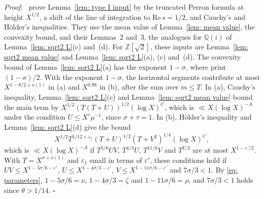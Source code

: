 \documentclass{article}
\numberwithin{equation}{section}
\newenvironment{proof}[1][Proof]{\par\medskip\noindent\textit{#1.}\ }{\hfill$\square$\par\medskip}
\newcommand{\Le}{\leqslant}
\begin{document}
\begin{proof}
\citet[pp.~126--127]{harman2001gaussian} prove Lemma~\ref{lem: type I input} by the truncated Perron formula at height $X^{1/2}$, a shift of the line of integration to $\mathrm{Re}\, s = 1/2$, and Cauchy's and Hölder's inequalities. They use the mean value of Lemma~\ref{lem: mean value}, the convexity bound, and their Lemmas~2 and~3, the analogues for $\mathbb{Q}(i)$ of Lemma~\ref{lem: sqrt2 L}(c) and~(d). For $\mathbb{Z}[\sqrt{2}]$, these inputs are Lemma~\ref{lem: sqrt2 mean value} and Lemma~\ref{lem: sqrt2 L}(a), (c) and~(d). The convexity bound of Lemma~\ref{lem: sqrt2 L}(a) has the exponent $1 - \sigma$, where \citet[p.~126]{harman2001gaussian} print $(1 - \sigma)/2$. With the exponent $1 - \sigma$, the horizontal segments contribute at most $X^{1 - \theta/2 + o(1)}$ in (a) and $X^{0.98}$ in (b), after the sum over $m \Le T$. In (a), Cauchy's inequality, Lemma~\ref{lem: sqrt2 L}(c) and Lemma~\ref{lem: sqrt2 mean value} bound the main term by $X^{1/2}(T(T + U))^{1/2} (\log X)^C$, which is $\ll X (\log X)^{-A}$ under the condition $U \Le X^{\tau} \mu^{-1}$, since $\sigma + \tau = 1$. In (b), Hölder's inequality and Lemma~\ref{lem: sqrt2 L}(d) give the bound
\begin{equation*}
X^{1/2} T^{5/12 + \varepsilon_1} (T + U)^{1/2} (T + V^2)^{1/4} (\log X)^C,
\end{equation*}
which is $\ll X (\log X)^{-A}$ if $T^{5/6} UV$, $T^{4/3} U$, $T^{11/6} V$ and $T^{7/3}$ are at most $X^{1 - \varepsilon'/2}$. With $T = X^{\sigma + o(1)}$ and $\varepsilon_1$ small in terms of $\varepsilon'$, these conditions hold if $UV \Le X^{1 - 5\sigma/6 - \varepsilon'}$, $U \Le X^{1 - 4\sigma/3 - \varepsilon'}$, $V \Le X^{1 - 11\sigma/6 - \varepsilon'}$ and $7\sigma/3 < 1$. By \eqref{eq: parameters}, $1 - 5\sigma/6 = \nu$, $1 - 4\sigma/3 = \zeta$ and $1 - 11\sigma/6 = \rho$, and $7\sigma/3 < 1$ holds since $\theta > 1/14$.
\end{proof}
\end{document}
